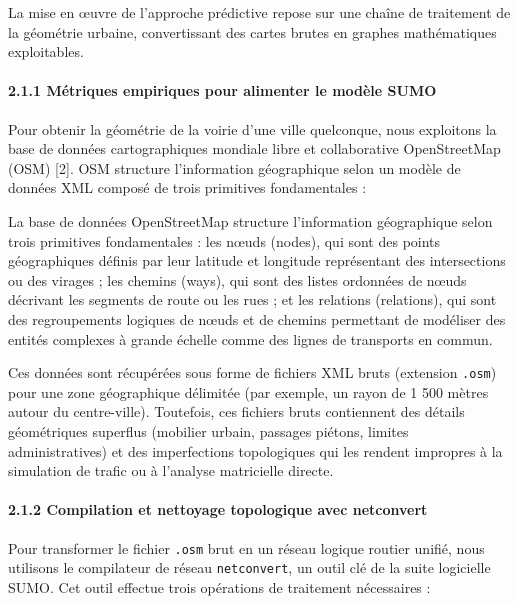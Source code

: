 \documentclass[10pt, a4paper]{article}
\begin{document}
La mise en œuvre de l'approche prédictive repose sur une chaîne de
traitement de la géométrie urbaine, convertissant des cartes brutes en
graphes mathématiques exploitables.

\paragraph{2.1.1 Métriques empiriques pour alimenter le modèle
SUMO}\label{muxe9triques-empiriques-pour-alimenter-le-moduxe8le-sumo}

Pour obtenir la géométrie de la voirie d'une ville quelconque, nous
exploitons la base de données cartographiques mondiale libre et
collaborative OpenStreetMap (OSM) {[}2{]}. OSM structure l'information
géographique selon un modèle de données XML composé de trois primitives
fondamentales :

La base de données OpenStreetMap structure l'information géographique
selon trois primitives fondamentales : les nœuds (nodes), qui sont des
points géographiques définis par leur latitude et longitude représentant
des intersections ou des virages ; les chemins (ways), qui sont des
listes ordonnées de nœuds décrivant les segments de route ou les rues ;
et les relations (relations), qui sont des regroupements logiques de
nœuds et de chemins permettant de modéliser des entités complexes à
grande échelle comme des lignes de transports en commun.

Ces données sont récupérées sous forme de fichiers XML bruts (extension
\texttt{.osm}) pour une zone géographique délimitée (par exemple, un
rayon de 1 500 mètres autour du centre-ville). Toutefois, ces fichiers
bruts contiennent des détails géométriques superflus (mobilier urbain,
passages piétons, limites administratives) et des imperfections
topologiques qui les rendent impropres à la simulation de trafic ou à
l'analyse matricielle directe.

\paragraph{2.1.2 Compilation et nettoyage topologique avec
netconvert}\label{compilation-et-nettoyage-topologique-avec-netconvert}

Pour transformer le fichier \texttt{.osm} brut en un réseau logique
routier unifié, nous utilisons le compilateur de réseau
\texttt{netconvert}, un outil clé de la suite logicielle SUMO. Cet outil
effectue trois opérations de traitement nécessaires :
\end{document}
